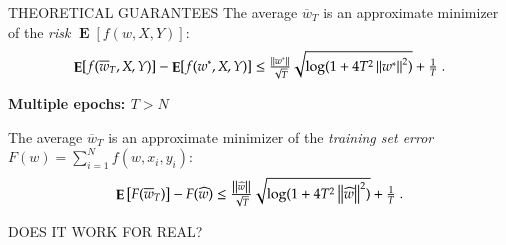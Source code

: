 \documentclass[final,t,serif,mathserif]{beamer}
\DeclareMathOperator*{\Exp}{\mathbf{E}}
\def\blockspaceb{\vspace{0.05cm}}
\begin{document}
\begin{frame}{}
\begin{columns}[t]
\begin{column}{.33\linewidth}
\begin{block}{THEORETICAL GUARANTEES}
	The average $\overline{w}_T$ is an approximate minimizer of the \emph{risk} $\Exp[f(w,X,Y)]$:
	\[
	\Exp[f(\overline{w}_T,X,Y)] - \Exp[f(w^*,X,Y)] \leq \tfrac{\norm{w^*}}{\sqrt{T}} \sqrt{\log(1+4 T^2 \norm{w^*}^2)} +\tfrac{1}{T} \; .
	\]
	
	\vspace{1cm}
	
	\textbf{Multiple epochs: $T>N$}
	
	The average $\overline{w}_T$ is an approximate minimizer of the \emph{training set error} $F(w) = \sum_{i=1}^N f(w,x_i,y_i)$:
	\[
	\Exp\left[F(\overline{w}_T)\right] - F(\widehat{w}) \leq \tfrac{\norm{\widehat{w}}}{\sqrt{T}} \sqrt{\log(1+4 T^2 \norm{\widehat{w}}^2)} +\tfrac{1}{T} \; .
	\]
	
	\blockspaceb	
    \end{block}

    \begin{block}{DOES IT WORK FOR REAL?}
      \blockspaceb
      

\end{block}
\end{column}
\end{columns}
\end{frame}
\end{document}
